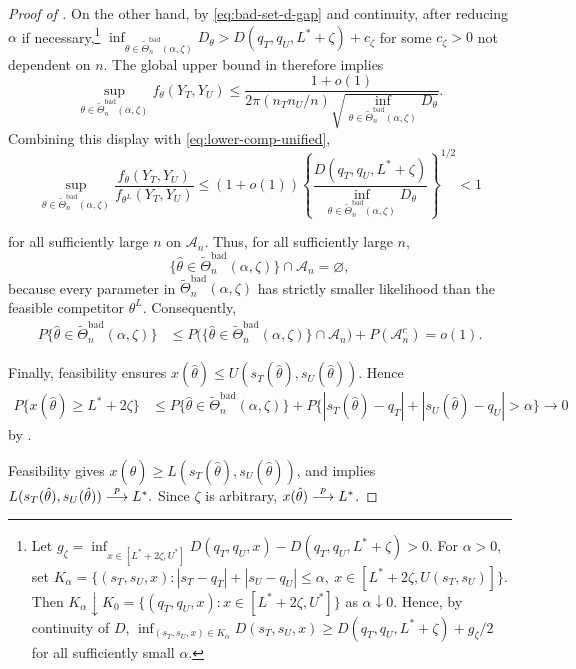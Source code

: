 \documentclass[12pt,reqno]{amsart}
\begin{document}
\begin{proof}[Proof of ]
On the other hand, by \eqref{eq:bad-set-d-gap} and continuity, after reducing
\(\alpha\) if necessary,\footnote{Let
\(
g_\zeta
=
\inf_{x\in[L^*+2\zeta,U^*]}D(q_T,q_U,x)
-D(q_T,q_U,L^*+\zeta)>0 .
\)
For \(\alpha>0\), set
\(
K_\alpha
=
\{(s_T,s_U,x): |s_T-q_T|+|s_U-q_U|\le\alpha,\
x\in[L^*+2\zeta,U(s_T,s_U)]\}.
\)
Then \(K_\alpha\downarrow K_0=\{(q_T,q_U,x):x\in[L^*+2\zeta,U^*]\}\) as
\(\alpha\downarrow0\).  Hence, by continuity of \(D\),
\(
\inf_{(s_T,s_U,x)\in K_\alpha}D(s_T,s_U,x)
\ge D(q_T,q_U,L^*+\zeta)+g_\zeta/2
\)
for all sufficiently small \(\alpha\).}
\(
\inf_{\theta\in\widetilde\Theta^{\mathrm{bad}}_n(\alpha,\zeta)}D_\theta
>
D(q_T,q_U,L^*+\zeta) + c_\zeta
\)
for some $c_\zeta > 0$ not dependent on $n$.  The global upper bound in
\Cref{lem:ftheta-ratio} therefore
implies
\[
\sup_{\theta\in\widetilde\Theta^{\mathrm{bad}}_n(\alpha,\zeta)}
f_\theta(Y_T,Y_U)
\le
\frac{1+o(1)}
{2\pi(n_Tn_U/n)
\sqrt{\inf_{\theta\in\widetilde\Theta^{\mathrm{bad}}_n(\alpha,\zeta)}D_\theta}}.
\]
Combining this display with \eqref{eq:lower-comp-unified},
\[
\sup_{\theta\in\widetilde\Theta^{\mathrm{bad}}_n(\alpha,\zeta)}
\frac{f_\theta(Y_T,Y_U)}{f_{\theta^L}(Y_T,Y_U)}
\le
(1+o(1))
\left\{
\frac{D(q_T,q_U,L^*+\zeta)}
{\inf_{\theta\in\widetilde\Theta^{\mathrm{bad}}_n(\alpha,\zeta)}D_\theta}
\right\}^{1/2}
<1
\]
{for all sufficiently large \(n\) on \(\mathcal A_n\).  Thus, for
all sufficiently large \(n\),
\[
\{\hat\theta\in\widetilde\Theta^{\mathrm{bad}}_n(\alpha,\zeta)\}
\cap\mathcal A_n
=\varnothing,
\]
because every parameter in $\widetilde\Theta^{\mathrm{bad}}_n(\alpha,\zeta)$ has strictly
smaller likelihood than
the feasible competitor \(\theta^L\).  Consequently,
\[
\begin{aligned}
P\{\hat\theta\in\widetilde\Theta^{\mathrm{bad}}_n(\alpha,\zeta)\}
&\le
P\bigl(
\{\hat\theta\in\widetilde\Theta^{\mathrm{bad}}_n(\alpha,\zeta)\}
\cap\mathcal A_n
\bigr)
+P(\mathcal A_n^c) =o(1).
\end{aligned}
\]

Finally, feasibility ensures
\(x(\hat\theta)\le U(s_T(\hat\theta),s_U(\hat\theta))\).  Hence
\[
\begin{aligned}
P\{x(\hat\theta)\ge L^*+2\zeta\}
&\le
P\{\hat\theta\in\widetilde\Theta^{\mathrm{bad}}_n(\alpha,\zeta)\} + P\bigl\{
|s_T(\hat\theta)-q_T|+|s_U(\hat\theta)-q_U|>\alpha
\bigr\}
\to0
\end{aligned}
\]
by .}
Feasibility gives \(x(\hat\theta)\ge L(s_T(\hat\theta),s_U(\hat\theta))\), and
\Cref{lem:mle-margin-consistency} implies
$L(s_T(\hat\theta),s_U(\hat\theta))\overset{p}{\longrightarrow} L^*.
$ Since $\zeta$ is arbitrary,
 \(x(\hat\theta)\overset{p}{\longrightarrow} L^*\).


\end{proof}
\end{document}

